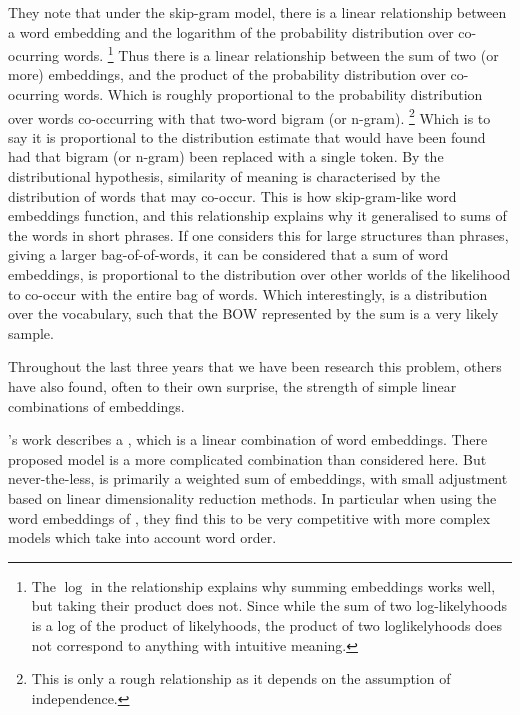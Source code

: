 \documentclass{book}
\begin{document}
They note that under the skip-gram model,
there is a linear relationship between a word embedding and the logarithm of the probability distribution over co-ocurring words.%
\footnote{The $\log$ in the relationship explains why summing embeddings works well, but taking their product does not. Since while the sum of two log-likelyhoods is a log of the product of likelyhoods, the product of two loglikelyhoods does not correspond to anything with intuitive meaning.}
Thus there is a linear relationship between the sum of two (or more) embeddings,
and the product of the probability distribution over co-ocurring words.
Which is roughly proportional to the probability distribution over words co-occurring with that two-word bigram (or n-gram).%
\footnote{This is only a rough relationship as it depends on the assumption of independence.}
Which is to say it is proportional to the distribution estimate that would have been found had that bigram (or n-gram) been replaced with a single token.
By the distributional hypothesis, similarity of meaning is characterised by the distribution of words that may co-occur.
This is how skip-gram-like word embeddings function, and this relationship explains why it generalised to sums of the words in short phrases.
If one considers this for large structures than phrases, giving a larger bag-of-of-words,
it can be considered that a sum of word embeddings,
is proportional to the distribution over other worlds of the likelihood to co-occur with the entire bag of words.
Which interestingly, is a distribution over the vocabulary, such that the BOW represented by the sum is a very likely sample.








Throughout the last three years that we have been research this problem,
others have also found, often to their own surprise,
the strength of simple linear combinations of embeddings.

\citet{arora2016simple}'s work describes a ,
which is a linear combination of word embeddings.
There proposed model is a more complicated combination than considered here.
But never-the-less, is primarily a weighted sum of embeddings, with small adjustment based on linear dimensionality reduction methods.
In particular when using the word embeddings of \citet{wieting2015towards}, they find this to be very competitive with more complex models which take into account word order.
\end{document}
